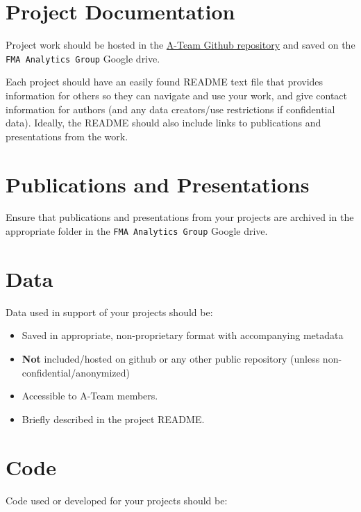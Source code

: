 \documentclass[
  letterpaper,
  DIV=11,
  numbers=noendperiod]{scrreprt}
\providecommand{\tightlist}{%
  \setlength{\itemsep}{0pt}\setlength{\parskip}{0pt}}\usepackage{longtable,booktabs,array}
\begin{document}
\section{Project Documentation}\label{project-documentation}

Project work should be hosted in the
\href{https://github.com/Alaska-Fisheries-Monitoring-Analytics}{A-Team
Github repository} and saved on the \texttt{FMA\ Analytics\ Group}
Google drive.

Each project should have an easily found README text file that provides
information for others so they can navigate and use your work, and give
contact information for authors (and any data creators/use restrictions
if confidential data). Ideally, the README should also include links to
publications and presentations from the work.

\section{Publications and
Presentations}\label{publications-and-presentations}

Ensure that publications and presentations from your projects are
archived in the appropriate folder in the \texttt{FMA\ Analytics\ Group}
Google drive.

\section{Data}\label{data}

Data used in support of your projects should be:

\begin{itemize}
\tightlist
\item
  Saved in appropriate, non-proprietary format with accompanying
  metadata
\item
  \textbf{Not} included/hosted on github or any other public repository
  (unless non-confidential/anonymized)\\
\item
  Accessible to A-Team members.
\item
  Briefly described in the project README.
\end{itemize}

\section{Code}\label{code}

Code used or developed for your projects should be:
\end{document}
